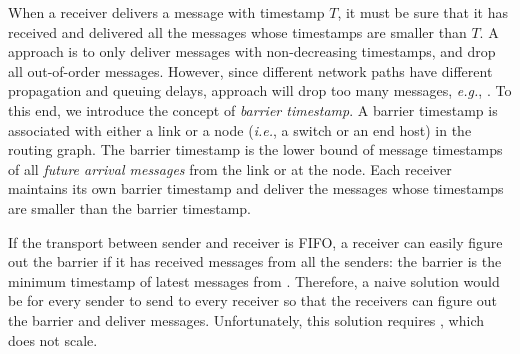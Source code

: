 When a receiver delivers a message with timestamp $T$, it must be sure that it has received and delivered all the messages whose timestamps are smaller than $T$.
A  approach is to only deliver messages with non-decreasing timestamps, and drop all out-of-order messages.
However, since different network paths have different propagation and queuing delays,  approach will drop too many messages, \textit{e.g.}, . %
To this end, we introduce the concept of \emph{barrier timestamp}.
A barrier timestamp is associated with either a link or a node (\textit{i.e.}, a switch or an end host) in the routing graph.
The barrier timestamp is the lower bound of message timestamps of all \emph{future arrival messages} from the link or at the node.
Each receiver maintains its own barrier timestamp and deliver the messages whose timestamps are smaller than the barrier timestamp.

If the transport between sender and receiver is FIFO, a receiver can easily figure out the barrier if it has received messages from all the senders: the barrier is the minimum timestamp of latest messages from . Therefore, a naive solution would be for every sender to send  to every receiver so that the receivers can figure out the barrier and deliver messages. Unfortunately, this solution requires , which does not scale.




